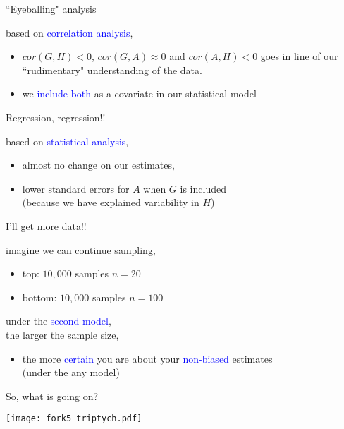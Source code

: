 %
%
\begin{lhframe}[rhgraphic={\texttt{[image: fork5\_panel.pdf]}}]
	{``Eyeballing" analysis}
	
	based on \textcolor{blue}{correlation analysis},
	\begin{itemize}
		\item $cor(G, H)<0$, $cor(G, A) \approx 0$ and $cor(A, H) < 0$ goes in line of our ``rudimentary" understanding of the data.
		\item we \textcolor{blue}{include both} as a covariate in our statistical model
	\end{itemize}
\end{lhframe}
%
%
\begin{lhframe}[rhgraphic={\texttt{[image: fork5\_reg.png]}}]
	{Regression, regression!!}
	
	based on \textcolor{blue}{statistical analysis},
	\begin{itemize}
		\item almost no change on our estimates,
		\item lower standard errors for $A$ when $G$ is included \\
		{\small (because we have explained variability in $H$)}
	\end{itemize}
\end{lhframe}
%
%
\begin{lhframe}[rhgraphic={\texttt{[image: fork5\_samplesize.pdf]}}]
	{I'll get more data!!}
	
	imagine we can continue sampling,
	\begin{itemize}
		\item top: $10,000$ samples $n=20$
		\item bottom: $10,000$ samples $n=100$
	\end{itemize}
	
	under the \textcolor{blue}{second model}, \\
	the larger the sample size,
	\begin{itemize}
		\item the more \textcolor{blue}{certain} you are about your \textcolor{blue}{non-biased} estimates \\
		{\small (under the any model)}
	\end{itemize}
\end{lhframe}
%
%
\begin{frame}
	{So, what is going on?}
	
	\begin{figure*}
		\texttt{[image: fork5\_triptych.pdf]}
	\end{figure*}
\end{frame}
%
%
